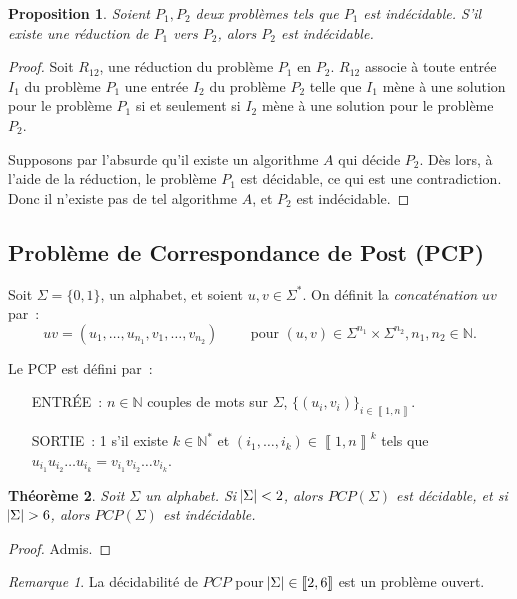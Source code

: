 \documentclass{article}
\newtheorem{thm}{Théorème}[section]
\newtheorem{prp}[thm]{Proposition}
\theoremstyle{definition}
\theoremstyle{remark}
\newtheorem*{rmq}{Remarque}
\newcommand{\intint}[2]{\left\llbracket#1, #2\right\rrbracket}
\newcommand{\N}{\mathbb N}
\begin{document}
	\begin{prp} Soient $P_1, P_2$ deux problèmes tels que $P_1$ est indécidable. S'il existe une réduction de $P_1$ vers $P_2$, alors $P_2$ est indécidable.
	\end{prp}

	\begin{proof} Soit $R_{12}$, une réduction du problème $P_1$ en $P_2$. $R_{12}$ associe à toute entrée $I_1$ du problème $P_1$ une entrée $I_2$ du
	problème $P_2$ telle que $I_1$ mène à une solution pour le problème $P_1$ si et seulement si $I_2$ mène à une solution pour le problème $P_2$.

	Supposons par l'absurde qu'il existe un algorithme $A$ qui décide $P_2$. Dès lors, à l'aide de la réduction, le problème $P_1$ est décidable, ce qui
	est une contradiction. Donc il n'existe pas de tel algorithme $A$, et $P_2$ est indécidable.
	\end{proof}

	\subsection{Problème de Correspondance de Post (PCP)}
		Soit $\Sigma = \{0, 1\}$, un alphabet, et soient $u, v \in \Sigma^*$. On définit la \textit{concaténation} $uv$ par~:
		\[uv = (u_1, \ldots, u_{n_1}, v_1, \ldots, v_{n_2})\qquad\text{ pour } (u, v) \in \Sigma^{n_1} \times \Sigma^{n_2}, n_1, n_2 \in \N.\]

		Le PCP est défini par~:
		\begin{itemize}
			\item[ENTRÉE~:] $n \in \N$ couples de mots sur $\Sigma$, $\{(u_i, v_i)\}_{i \in \intint 1n}$.
			\item[SORTIE~:] 1 s'il existe $k \in \N^*$ et $(i_1, \ldots, i_k) \in \intint 1n^k$ tels que $u_{i_1}u_{i_2}\ldots u_{i_k} = v_{i_1}v_{i_2}\ldots v_{i_k}$.
		\end{itemize}

		\begin{thm} Soit $\Sigma$ un alphabet. Si $\abs \Sigma < 2$, alors $PCP(\Sigma)$ est décidable, et si $\abs \Sigma > 6$, alors $PCP(\Sigma)$ est indécidable.
		\end{thm}

		\begin{proof} Admis.
		\end{proof}

		\begin{rmq} La décidabilité de $PCP$ pour $\abs \Sigma \in \intint 26$ est un problème ouvert.
		\end{rmq}
\end{document}
